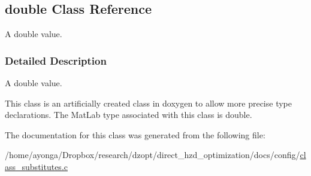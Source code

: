 \hypertarget{classdouble}{}\subsection{double Class Reference}
\label{classdouble}


A double value.  




\subsubsection{Detailed Description}
A double value. 

This class is an artificially created class in doxygen to allow more precise type declarations. The Mat\+Lab type associated with this class is double. 

The documentation for this class was generated from the following file\+:\begin{DoxyCompactItemize}
\item 
/home/ayonga/\+Dropbox/research/dzopt/direct\+\_\+hzd\+\_\+optimization/docs/config/\hyperlink{class__substitutes_8c}{class\+\_\+substitutes.\+c}\end{DoxyCompactItemize}
